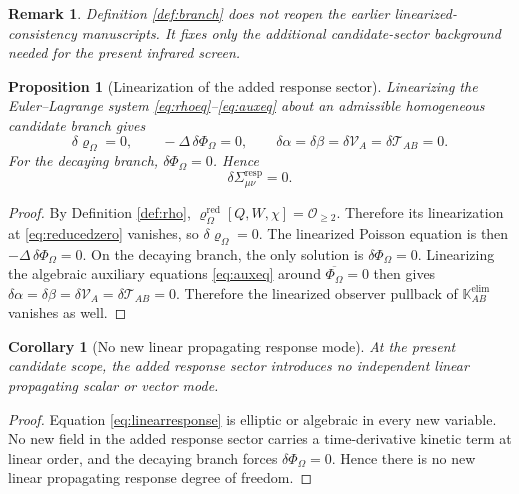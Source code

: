 \documentclass[11pt]{article}
\newcommand{\ResponseShift}{\Sigma^{\mathrm{resp}}}
\newcommand{\AuxPol}{\mathbb K}
\newcommand{\FlowPot}{\Phi_\Omega}
\newcommand{\SourceDensity}{\varrho_\Omega}
\newcommand{\SourceDensityRed}{\varrho_\Omega^{\mathrm{red}}}
\newtheorem{proposition}{Proposition}
\newtheorem{remark}{Remark}
\newtheorem{corollary}{Corollary}
\begin{document}
\begin{remark}
Definition \ref{def:branch} does not reopen the earlier linearized-consistency manuscripts. It fixes only the additional candidate-sector background needed for the present infrared screen.
\end{remark}

\begin{proposition}[Linearization of the added response sector]
\label{prop:linear}
Linearizing the Euler--Lagrange system \eqref{eq:rhoeq}--\eqref{eq:auxeq} about an admissible homogeneous candidate branch gives
\begin{equation}
\delta\SourceDensity=0,
\qquad
-\Delta\,\delta\FlowPot=0,
\qquad
\delta\alpha=\delta\beta=\delta\mathcal V_A=\delta\mathcal T_{AB}=0.
\label{eq:linearresponse}
\end{equation}
For the decaying branch, \(\delta\FlowPot=0\). Hence
\begin{equation}
\delta\ResponseShift_{\mu\nu}=0.
\label{eq:deltasigma}
\end{equation}
\end{proposition}

\begin{proof}
By Definition \ref{def:rho}, \(\SourceDensityRed[Q,W,\chi]=\mathcal O_{\ge 2}\). Therefore its linearization at \eqref{eq:reducedzero} vanishes, so \(\delta\SourceDensity=0\). The linearized Poisson equation is then \(-\Delta\,\delta\FlowPot=0\). On the decaying branch, the only solution is \(\delta\FlowPot=0\). Linearizing the algebraic auxiliary equations \eqref{eq:auxeq} around \(\overline{\FlowPot}=0\) then gives \(\delta\alpha=\delta\beta=\delta\mathcal V_A=\delta\mathcal T_{AB}=0\). Therefore the linearized observer pullback of \(\AuxPol_{AB}^{\mathrm{elim}}\) vanishes as well.
\end{proof}

\begin{corollary}[No new linear propagating response mode]
\label{cor:nomode}
At the present candidate scope, the added response sector introduces no independent linear propagating scalar or vector mode.
\end{corollary}

\begin{proof}
Equation \eqref{eq:linearresponse} is elliptic or algebraic in every new variable. No new field in the added response sector carries a time-derivative kinetic term at linear order, and the decaying branch forces \(\delta\FlowPot=0\). Hence there is no new linear propagating response degree of freedom.
\end{proof}
\end{document}
